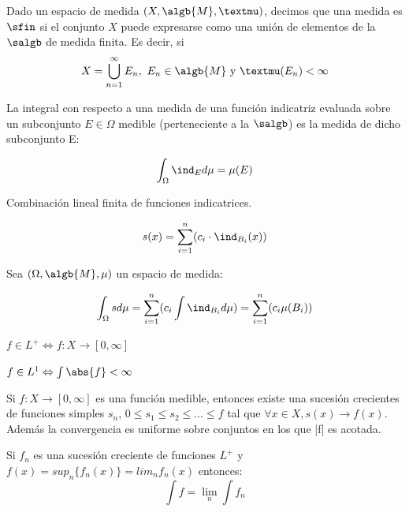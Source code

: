 \documentclass{apuntes}
\begin{document}
\begin{defn}\label{defSigmaFinita}
Dado un espacio de medida $(X, \algb{M}, µ)$, decimos que una medida es $\sfin$ si el conjunto $X$ puede expresarse como una unión de elementos de la $\salgb$ de medida finita. Es decir, si \[X=\bigcup_{n=1}^{\infty}E_n, \ E_n \in \algb{M} \text{ y }µ(E_n)< \infty\]
\end{defn}

\begin{defn}
La integral con respecto a una medida de una función indicatriz evaluada sobre un subconjunto $E \in \Omega$ medible (perteneciente a la $\salgb$) es la medida de dicho subconjunto E:

\[\int_{\Omega} \ind_{E}d\mu = \mu(E)\]
\end{defn}

\begin{defn}
Combinación lineal finita de funciones indicatrices.

\[
s(x) = \sum_{i=1}^{n}(c_i \cdot \ind_{B_i}(x))
\]
\end{defn}

\begin{defn}
Sea $(\Omega,\algb{M},\mu)$ un espacio de medida:

\[\int_{\Omega} sd\mu = \sum_{i=1}^{n}(c_i \int \ind_{B_i} d\mu) = \sum_{i=1}^{n}(c_i \mu(B_i))\]
\end{defn}

\begin{defn}[Función $L^+$]
$f \in L^+ \Leftrightarrow f:X\rightarrow [0, \infty]$
\end{defn}

\begin{defn}[Función $L^1$]
$f \in L^1 \Leftrightarrow \int \abs{f} < \infty $
\end{defn}

\begin{defn}
Si $f:X \rightarrow [0, \infty]$ es una función medible, entonces existe una sucesión crecientes de funciones simples $s_n$, $0 \leq s_1 \leq s_2 \leq ... \leq f$ tal que $\forall x  \in X, s(x) \rightarrow f(x)$. Además la convergencia es uniforme sobre conjuntos en los que |f| es acotada.
\end{defn}

\begin{defn}
Si $f_n$ es una sucesión creciente de funciones $L^+$ y $f(x)=sup_n\{f_n(x)\}=lim_nf_n(x)$ entonces:
\[
\int f = \lim_n \int f_n
\]
\end{defn}
\end{document}
